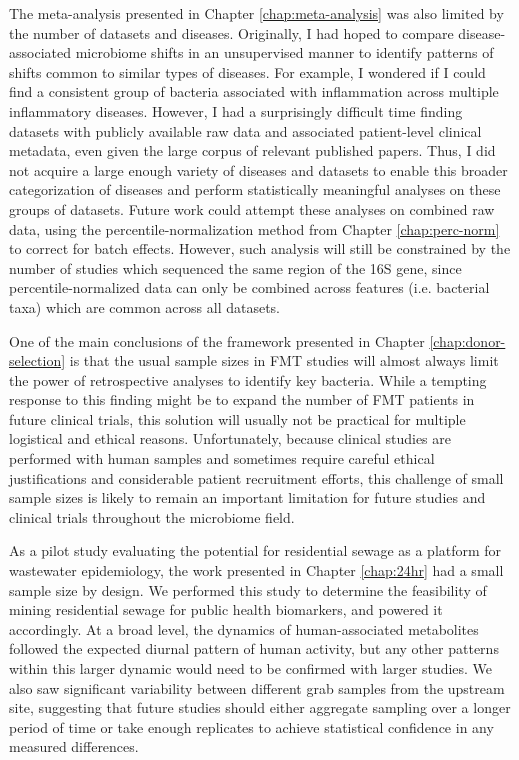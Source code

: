 The meta-analysis presented in Chapter \ref{chap:meta-analysis} was also limited by the number of datasets and diseases.
Originally, I had hoped to compare disease-associated microbiome shifts in an unsupervised manner to identify patterns of shifts common to similar types of diseases.
For example, I wondered if I could find a consistent group of bacteria associated with inflammation across multiple inflammatory diseases.
However, I had a surprisingly difficult time finding datasets with publicly available raw data and associated patient-level clinical metadata, even given the large corpus of relevant published papers.
Thus, I did not acquire a large enough variety of diseases and datasets to enable this broader categorization of diseases and perform statistically meaningful analyses on these groups of datasets.
Future work could attempt these analyses on combined raw data, using the percentile-normalization method from Chapter \ref{chap:perc-norm} to correct for batch effects.
However, such analysis will still be constrained by the number of studies which sequenced the same region of the 16S gene, since percentile-normalized data can only be combined across features (i.e. bacterial taxa) which are common across all datasets.

One of the main conclusions of the framework presented in Chapter \ref{chap:donor-selection} is that the usual sample sizes in FMT studies will almost always limit the power of retrospective analyses to identify key bacteria.
While a tempting response to this finding might be to expand the number of FMT patients in future clinical trials, this solution will usually not be practical for multiple logistical and ethical reasons.
Unfortunately, because clinical studies are performed with human samples and sometimes require careful ethical justifications and considerable patient recruitment efforts, this challenge of small sample sizes is likely to remain an important limitation for future studies and clinical trials throughout the microbiome field.

As a pilot study evaluating the potential for residential sewage as a platform for wastewater epidemiology, the work presented in Chapter \ref{chap:24hr} had a small sample size by design.
We performed this study to determine the feasibility of mining residential sewage for public health biomarkers, and powered it accordingly.
At a broad level, the dynamics of human-associated metabolites followed the expected diurnal pattern of human activity, but any other patterns within this larger dynamic would need to be confirmed with larger studies.
We also saw significant variability between different grab samples from the upstream site, suggesting that future studies should either aggregate sampling over a longer period of time or take enough replicates to achieve statistical confidence in any measured differences.

